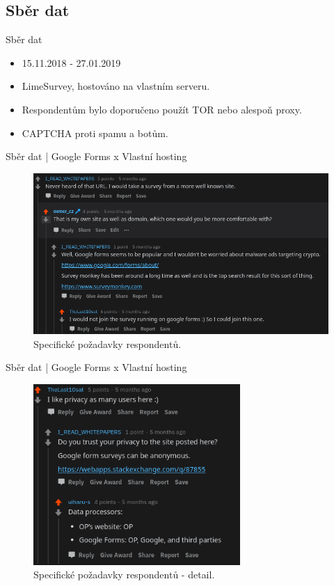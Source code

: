 \documentclass{beamer}
\begin{document}
\begin{darkframes}
    \subsection{Sběr dat}
    \begin{frame}{Sběr dat}
     \begin{itemize}
     \item 15.11.2018 - 27.01.2019
     \item LimeSurvey, hostováno na vlastním serveru.
     \item Respondentům bylo doporučeno použít TOR nebo alespoň proxy.
     \item CAPTCHA proti spamu a botům.
     \end{itemize}
    \end{frame}
        \begin{frame}{Sběr dat | Google Forms x Vlastní hosting}
    	\begin{figure}
  \centering
  \includegraphics[width=1\textwidth]{survey-discussion.png}
  \caption{Specifické požadavky respondentů.}  \label{fig:xray}
\end{figure}
    \end{frame}
    \begin{frame}{Sběr dat | Google Forms x Vlastní hosting}
    	\begin{figure}
  \centering
  \includegraphics[width=0.7\textwidth]{survey-website.png}
  \caption{Specifické požadavky respondentů - detail.}  \label{fig:xray}
\end{figure}
    \end{frame}

\end{darkframes}
\end{document}
